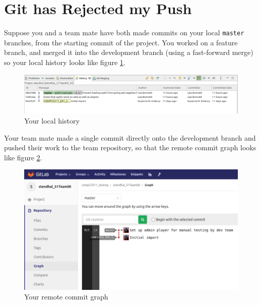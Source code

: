 \documentclass[
]{book}
\begin{document}
\hypertarget{rejected}{%
\section{Git has Rejected my Push}\label{rejected}}

Suppose you and a team mate have both made commits on your local \texttt{master} branches, from the starting commit of the project. You worked on a feature branch, and merged it into the development branch (using a fast-forward merge) so your local history looks like figure \ref{fig:localCommitGraphBeforeRejectedPushNoHistoryGraphOnly-fig}.

\begin{figure}

{\centering \includegraphics[width=1\linewidth]{images/localCommitGraphBeforeRejectedPushNoHistoryGraphOnly} 

}

\caption{Your local history}\label{fig:localCommitGraphBeforeRejectedPushNoHistoryGraphOnly-fig}
\end{figure}

Your team mate made a single commit directly onto the development branch and pushed their work to the team repository, so that the remote commit graph looks like figure \ref{fig:commitGraphInGitLabAfterPushNoHistoryGraphOnly-fig}.

\begin{figure}

{\centering \includegraphics[width=1\linewidth]{images/commitGraphInGitLabAfterPushNoHistoryGraphOnly} 

}

\caption{Your remote commit graph}\label{fig:commitGraphInGitLabAfterPushNoHistoryGraphOnly-fig}
\end{figure}
\end{document}
